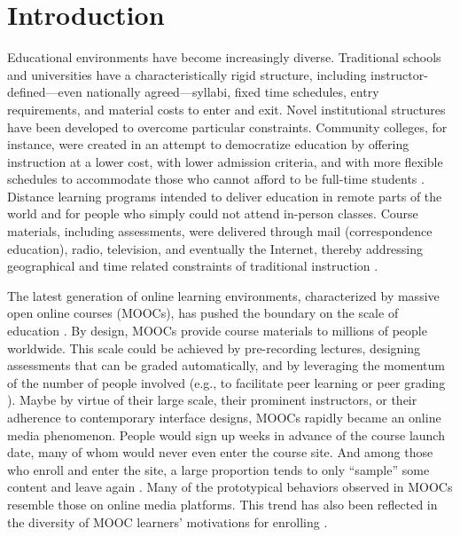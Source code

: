 \documentclass{sigchi}\usepackage[]{graphicx}\usepackage[]{color}
\begin{document}




\section{Introduction}

Educational environments have become increasingly diverse. Traditional schools and universities have a characteristically rigid structure, including instructor-defined---even nationally agreed---syllabi, fixed time schedules, entry requirements, and material costs to enter and exit. Novel institutional structures have been developed to overcome particular constraints. Community colleges, for instance, were created in an attempt to democratize education by offering instruction at a lower cost, with lower admission criteria, and with more flexible schedules to accommodate those who cannot afford to be full-time students \cite{goldrick2010challenges}. Distance learning programs intended to deliver education in remote parts of the world and for people who simply could not attend in-person classes. Course materials, including assessments, were delivered through mail (correspondence education), radio, television, and eventually the Internet, thereby addressing geographical and time related constraints of traditional instruction \cite{moore1996distance}.

The latest generation of online learning environments, characterized by massive open online courses (MOOCs), has pushed the boundary on the scale of education \cite{waldrop2013campus}. By design, MOOCs provide course materials to millions of people worldwide. This scale could be achieved by pre-recording lectures, designing assessments that can be graded automatically, and by leveraging the momentum of the number of people involved (e.g., to facilitate peer learning or peer grading \cite{kulkarni2013peer,cambre2014talkabout}). Maybe by virtue of their large scale, their prominent instructors, or their adherence to contemporary interface designs, MOOCs rapidly became an online media phenomenon. People would sign up weeks in advance of the course launch date, many of whom would never even enter the course site. And among those who enroll and enter the site, a large proportion tends to only ``sample'' some content and leave again \cite{kizilcec2013deconstructing}. Many of the prototypical behaviors observed in MOOCs \cite{kizilcec2013deconstructing,breslow2013studying} resemble those on online media platforms. This trend has also been reflected in the diversity of MOOC learners' motivations for enrolling \cite{kizilcec2015motivation}.
\end{document}
